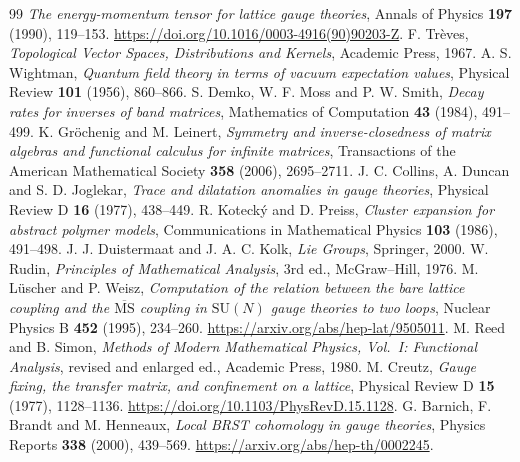 \begin{thebibliography}{99}
\emph{The energy-momentum tensor for lattice gauge theories},
Annals of Physics \textbf{197} (1990), 119--153.
\url{https://doi.org/10.1016/0003-4916(90)90203-Z}.
 F. Tr\`eves,
\emph{Topological Vector Spaces, Distributions and Kernels},
Academic Press, 1967.
 A. S. Wightman,
\emph{Quantum field theory in terms of vacuum expectation values},
Physical Review \textbf{101} (1956), 860--866.
 S. Demko, W. F. Moss and P. W. Smith,
\emph{Decay rates for inverses of band matrices},
Mathematics of Computation \textbf{43} (1984), 491--499.
 K. Gr\"ochenig and M. Leinert,
\emph{Symmetry and inverse-closedness of matrix algebras and functional calculus for infinite matrices},
Transactions of the American Mathematical Society \textbf{358} (2006), 2695--2711.
 J. C. Collins, A. Duncan and S. D. Joglekar,
\emph{Trace and dilatation anomalies in gauge theories},
Physical Review D \textbf{16} (1977), 438--449.
 R. Koteck\'y and D. Preiss,
\emph{Cluster expansion for abstract polymer models},
Communications in Mathematical Physics \textbf{103} (1986), 491--498.
 J. J. Duistermaat and J. A. C. Kolk,
\emph{Lie Groups}, Springer, 2000.
 W. Rudin, \emph{Principles of Mathematical Analysis},
3rd ed., McGraw--Hill, 1976.
 M. L\"uscher and P. Weisz,
\emph{Computation of the relation between the bare lattice coupling
and the $\overline{\mathrm{MS}}$ coupling in $\mathrm{SU}(N)$ gauge theories
to two loops}, Nuclear Physics B \textbf{452} (1995), 234--260.
\url{https://arxiv.org/abs/hep-lat/9505011}.
 M. Reed and B. Simon,
\emph{Methods of Modern Mathematical Physics, Vol.~I: Functional Analysis},
revised and enlarged ed., Academic Press, 1980.
 M. Creutz,
\emph{Gauge fixing, the transfer matrix, and confinement on a lattice},
Physical Review D \textbf{15} (1977), 1128--1136.
\url{https://doi.org/10.1103/PhysRevD.15.1128}.
 G. Barnich, F. Brandt and M. Henneaux,
\emph{Local BRST cohomology in gauge theories},
Physics Reports \textbf{338} (2000), 439--569.
\url{https://arxiv.org/abs/hep-th/0002245}.
\end{thebibliography}
